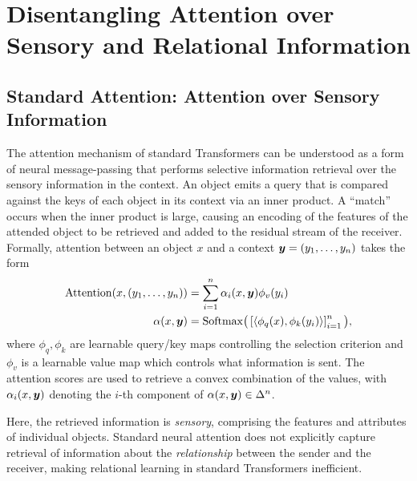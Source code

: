 \section{Disentangling Attention over Sensory and Relational Information}

\subsection{Standard Attention: Attention over Sensory Information}

The attention mechanism of standard Transformers can be understood as a form of neural message-passing that performs selective information retrieval over the sensory information in the context. An object emits a query that is compared against the keys of each object in its context via an inner product. A ``match'' occurs when the inner product is large, causing an encoding of the features of the attended object to be retrieved and added to the residual stream of the receiver. Formally, attention between an object $x$ and a context $\bm{y} = (y_1, \ldots, y_n)$ takes the form%
\begin{equation}\label{eq:self_attn}
  \begin{split}
    \mathrm{Attention}(x, (y_1, \ldots, y_n)) &= \sum_{i=1}^{n} \alpha_i(x, \bm{y}) \phi_v(y_i) \\
    \alpha(x, \bm{y}) &= \mathrm{Softmax}\big(\left[\left \langle \phi_q(x), \phi_k(y_i) \right\rangle\right]_{i=1}^{n}\big),
  \end{split}
\end{equation}
where $\phi_q,\phi_k$ are learnable query/key maps controlling the selection criterion and $\phi_v$ is a learnable value map which controls what information is sent. The attention scores are used to retrieve a convex combination of the values, with $\alpha_i(x, \bm{y})$ denoting the $i$-th component of $\alpha(x, \bm{y}) \in \Delta^n$.

Here, the retrieved information is \textit{sensory}, comprising the features and attributes of individual objects. Standard neural attention does not explicitly capture retrieval of information about the \textit{relationship} between the sender and the receiver, making relational learning in standard Transformers inefficient.



